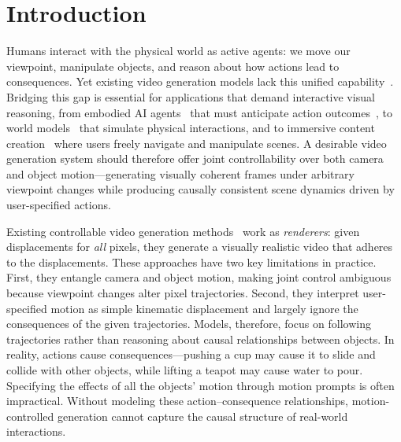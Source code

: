 \section{Introduction}
\label{sec:intro}

Humans interact with the physical world as active agents: we move our viewpoint, manipulate objects, and reason about how actions lead to consequences. Yet existing video generation models lack this unified capability~\cite{wan2025wan, CogVideo, AlignYourLatents, CogVideoX, VideoCrafter2}. Bridging this gap is essential for applications that demand interactive visual reasoning, from embodied AI agents~\cite{bar2025navigation, yang2023learning, wang2024drivedreamer} that must anticipate action outcomes~\cite{hafner2019dream, hafner2023mastering, gao2026dreamdojo}, to world models~\cite{hong2025relic, Sora, he2025matrix, yang2025matrix, ye2026world} that simulate physical interactions, and to immersive content creation~\cite{liu2025ponimator, liu2024physgen, chen2025physgen3d, li2025wonderplay, gao2024gaussianflow, wu2024draganything, zhang2024physdreamer} where users freely navigate and manipulate scenes. A desirable video generation system should therefore offer joint controllability over both camera and object motion---generating visually coherent frames under arbitrary viewpoint changes while producing causally consistent scene dynamics driven by user-specified actions.

Existing controllable video generation methods~\cite{MotionCtrl, geng2024motionprompting, wang2025ati, chu2025wanmove, burgert2025go, wang2024boximator} work as {\it renderers}: given displacements for {\it all} pixels, they generate a visually realistic video that adheres to the displacements.
These approaches have two key limitations in practice. First, they entangle camera and object motion, making joint control ambiguous because viewpoint changes alter pixel trajectories. Second, they interpret user-specified motion as simple kinematic displacement and largely ignore the consequences of the given trajectories. Models, therefore, focus on following trajectories rather than reasoning about causal relationships between objects. In reality, actions cause consequences—pushing a cup may cause it to slide and collide with other objects, while lifting a teapot may cause water to pour. Specifying the effects of all the objects' motion through motion prompts is often impractical. Without modeling these action–consequence relationships, motion-controlled generation cannot capture the causal structure of real-world interactions.

